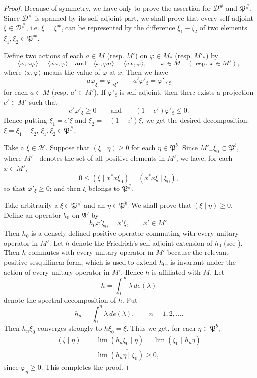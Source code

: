 \documentclass[12pt,b5paper,twoside]{article}
\theoremstyle{takesaki}
\numberwithin{equation}{section}
\begin{document}
\begin{proof}
Because of symmetry, we have only to prove the assertion for
$\mathcal D^{\#}$ and $\mathfrak P^{\#}$.  Since $\mathcal D^{\#}$ is
spanned by its self-adjoint part, we shall prove that every self-adjoint
$\xi\in\mathcal D^{\#}$, i.e. $\xi=\xi^{\#}$, can be represented by the
difference $\xi_1-\xi_2$ of two elements
$\xi_1,\xi_2\in\mathfrak P^{\#}$.

Define two actions of each $a\in M$ (resp. $M'$) on $\varphi\in M_*$
(resp. $M'_*$) by
\begin{equation}
  \langle x,a\varphi\rangle=\langle xa,\varphi\rangle
  \quad\text{and}\quad
  \langle x,\varphi a\rangle=\langle ax,\varphi\rangle,
  \qquad x\in M\quad(\text{resp. }x\in M'),
  \label{eq:15.3}
\end{equation}
where $\langle x,\varphi\rangle$ means the value of $\varphi$ at $x$.
Then we have
\[
  a\varphi_{\xi}=\varphi_{a\xi},
  \qquad a'\varphi'_{\xi}=\varphi'_{a'\xi}
\]
for each $a\in M$ (resp. $a'\in M'$).  If $\varphi'_{\xi}$ is
self-adjoint, then there exists a projection $e'\in M'$ such that
\[
  e'\varphi'_{\xi}\geq0
  \qquad\text{and}\qquad
  (1-e')\varphi'_{\xi}\leq0.
\]
Hence putting $\xi_1=e'\xi$ and $\xi_2=-(1-e')\xi$, we get the desired
decomposition: $\xi=\xi_1-\xi_2$,
$\xi_1,\xi_2\in\mathfrak P^{\#}$.

Take a $\xi\in\mathcal H$.  Suppose that $(\xi\mid\eta)\geq0$ for each
$\eta\in\mathfrak P^{b}$.  Since $M'_+\xi_0\subset\mathfrak P^{b}$,
where $M'_+$ denotes the set of all positive elements in $M'$, we have,
for each $x\in M'$,
\[
  0\leq(\xi\mid x^*x\xi_0)=(x^*x\xi\mid\xi_0),
\]
so that $\varphi'_{\xi}\geq0$; and then $\xi$ belongs to
$\mathfrak P^{\#}$.

Take arbitrarily a $\xi\in\mathfrak P^{\#}$ and an
$\eta\in\mathfrak P^{b}$.  We shall prove that $(\xi\mid\eta)\geq0$.
Define an operator $h_0$ on $\mathfrak A'$ by
\[
  h_0x'\xi_0=x'\xi,\qquad x'\in M'.
\]
Then $h_0$ is a densely defined positive operator commuting with every
unitary operator in $M'$.  Let $h$ denote the Friedrich's self-adjoint
extension of $h_0$ (see \cite[Chapter~XII]{ref6}).  Then $h$ commutes
with every unitary operator in $M'$ because the relevant positive
sesquilinear form, which is used to extend $h_0$, is invariant under the
action of every unitary operator in $M'$.  Hence $h$ is affiliated with
$M$.  Let
\[
  h=\int_0^\infty\lambda\,de(\lambda)
\]
denote the spectral decomposition of $h$.  Put
\[
  h_n=\int_0^n\lambda\,de(\lambda),\qquad n=1,2,\ldots.
\]
Then $h_n\xi_0$ converges strongly to $h\xi_0=\xi$.  Thus we get, for
each $\eta\in\mathfrak P^{b}$,
\begin{align*}
  (\xi\mid\eta)
    &=\lim (h_n\xi_0\mid\eta)
      =\lim (\xi_0\mid h_n\eta)\\
    &=\lim\overline{(h_n\eta\mid\xi_0)}\geq0,
\end{align*}
since $\varphi_{\eta}\geq0$.  This completes the proof.
\end{proof}
\end{document}
